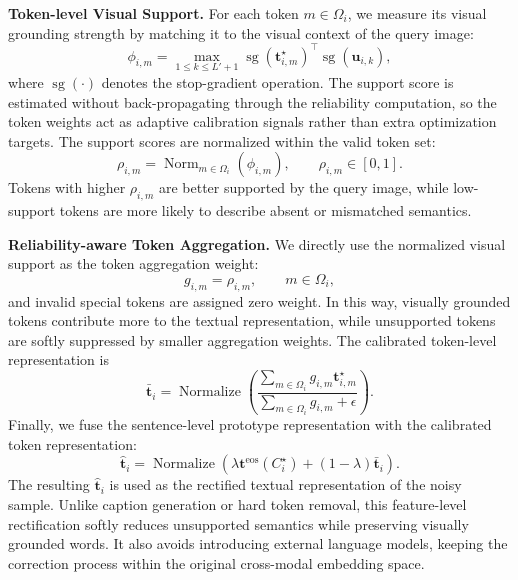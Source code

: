 \noindent\textbf{Token-level Visual Support.}
For each token $m\in\Omega_i$, we measure its visual grounding strength by matching it to the visual context of the query image:
\begin{equation}
    \phi_{i,m}
    =
    \max_{1\leq k\leq L'+1}
    \operatorname{sg}(\boldsymbol{t}_{i,m}^{\star})^{\top}
    \operatorname{sg}(\boldsymbol{u}_{i,k}),
\end{equation}
where $\operatorname{sg}(\cdot)$ denotes the stop-gradient operation. The support score is estimated without back-propagating through the reliability computation, so the token weights act as adaptive calibration signals rather than extra optimization targets.
The support scores are normalized within the valid token set:
\begin{equation}
    \rho_{i,m}=
    \operatorname{Norm}_{m\in\Omega_i}(\phi_{i,m}),
    \qquad
    \rho_{i,m}\in[0,1].
\end{equation}
Tokens with higher $\rho_{i,m}$ are better supported by the query image, while low-support tokens are more likely to describe absent or mismatched semantics.

\noindent\textbf{Reliability-aware Token Aggregation.}
We directly use the normalized visual support as the token aggregation weight:
\begin{equation}
    g_{i,m}=\rho_{i,m},
    \qquad m\in\Omega_i,
\end{equation}
and invalid special tokens are assigned zero weight. In this way, visually grounded tokens contribute more to the textual representation, while unsupported tokens are softly suppressed by smaller aggregation weights. The calibrated token-level representation is
\begin{equation}
    \bar{\boldsymbol{t}}_i
    =
    \operatorname{Normalize}
    \left(
    \frac{\sum_{m\in\Omega_i}g_{i,m}\boldsymbol{t}_{i,m}^{\star}}
    {\sum_{m\in\Omega_i}g_{i,m}+\epsilon}
    \right).
\end{equation}
Finally, we fuse the sentence-level prototype representation with the calibrated token representation:
\begin{equation}
    \widehat{\boldsymbol{t}}_i
    =
    \operatorname{Normalize}
    \left(
    \lambda\boldsymbol{t}^{\mathrm{eos}}(C_i^{\star})
    +(1-\lambda)\bar{\boldsymbol{t}}_i
    \right).
\end{equation}
The resulting $\widehat{\boldsymbol{t}}_i$ is used as the rectified textual representation of the noisy sample. Unlike caption generation or hard token removal, this feature-level rectification softly reduces unsupported semantics while preserving visually grounded words. It also avoids introducing external language models, keeping the correction process within the original cross-modal embedding space.

